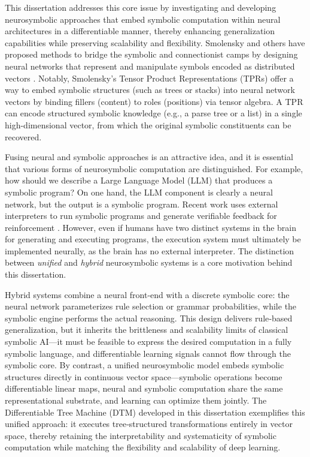 This dissertation addresses this core issue by investigating and developing neurosymbolic approaches that embed symbolic computation within neural architectures in a differentiable manner, thereby enhancing generalization capabilities while preserving scalability and flexibility. Smolensky and others have proposed methods to bridge the symbolic and connectionist camps by designing neural networks that represent and manipulate symbols encoded as distributed vectors \citep{smolensky_tensor_1990,gayler2003vsa_jackendoff,plate,pollack_recursive_1990}. Notably, Smolensky’s Tensor Product Representations (TPRs) offer a way to embed symbolic structures (such as trees or stacks) into neural network vectors by binding fillers (content) to roles (positions) via tensor algebra. A TPR can encode structured symbolic knowledge (e.g., a parse tree or a list) in a single high-dimensional vector, from which the original symbolic constituents can be recovered.

Fusing neural and symbolic approaches is an attractive idea, and it is essential that various forms of neurosymbolic computation are distinguished. For example, how should we describe a Large Language Model (LLM) that produces a symbolic program? On one hand, the LLM component is clearly a neural network, but the output is a symbolic program. Recent work uses external interpreters to run symbolic programs and generate verifiable feedback for reinforcement \citep{deepseekai2025deepseekr1incentivizingreasoningcapability}. However, even if humans have two distinct systems in the brain for generating and executing programs, the execution system must ultimately be implemented neurally, as the brain has no external interpreter. The distinction between \textit{unified} and \textit{hybrid} neurosymbolic systems is a core motivation behind this dissertation.

Hybrid systems combine a neural front‑end with a discrete symbolic core: the neural network parameterizes rule selection or grammar probabilities, while the symbolic engine performs the actual reasoning. This design delivers rule‑based generalization, but it inherits the brittleness and scalability limits of classical symbolic AI—it must be feasible to express the desired computation in a fully symbolic language, and differentiable learning signals cannot flow through the symbolic core. By contrast, a unified neurosymbolic model embeds symbolic structures directly in continuous vector space—symbolic operations become differentiable linear maps, neural and symbolic computation share the same representational substrate, and learning can optimize them jointly. The Differentiable Tree Machine (DTM) developed in this dissertation exemplifies this unified approach: it executes tree‐structured transformations entirely in vector space, thereby retaining the interpretability and systematicity of symbolic computation while matching the flexibility and scalability of deep learning.

